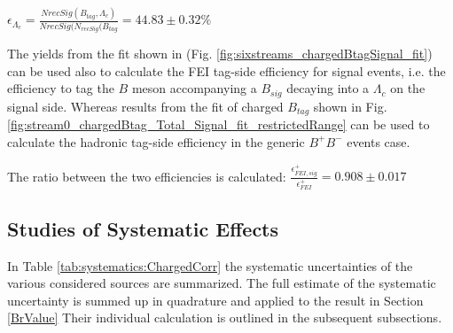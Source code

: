 $\epsilon_{\Lambda_c} = \frac{NrecSig(B_{tag}, \Lambda_c) }{NrecSig(N_{recSig}(B_{tag}} = 44.83 \pm 0.32 \%$  %
\vspace{0.2 cm}

The yields from the fit shown in  (Fig. \ref{fig:sixstreams_chargedBtagSignal_fit}) can be used also to calculate the FEI tag-side efficiency for signal events, i.e. the efficiency to tag the $B$ meson accompanying a $B_{sig}$ decaying into a $\Lambda_c $ on the signal side.
Whereas results from the fit  of charged $B_{tag}$ shown in Fig. \ref{fig:stream0_chargedBtag_Total_Signal_fit_restrictedRange} can be used to calculate the hadronic tag-side efficiency in the generic $B^+B^-$ events case.

The ratio between the two efficiencies is calculated: 
 $\frac{\epsilon^{+}_{FEI,  sig}}{\epsilon^{+}_{FEI}} = 0.908 \pm 0.017 $ \\\vspace{0.4 cm}
\newpage

\subsection{Studies of Systematic Effects}

In Table \ref{tab:systematics:ChargedCorr} the systematic uncertainties of the various considered sources are summarized. The full estimate of the systematic uncertainty is summed up in quadrature and applied to the result in Section \ref{BrValue}
Their individual calculation is outlined in the subsequent subsections.

\begin{table}[h]
\centering
{}%
\caption{Systematic uncertainties in the determination of the  $B^+ \rightarrow \bar{\Lambda}_c^- X$ branching fraction in \si{\percent}.}
\label{tab:systematics:ChargedCorr}
\end{table}

